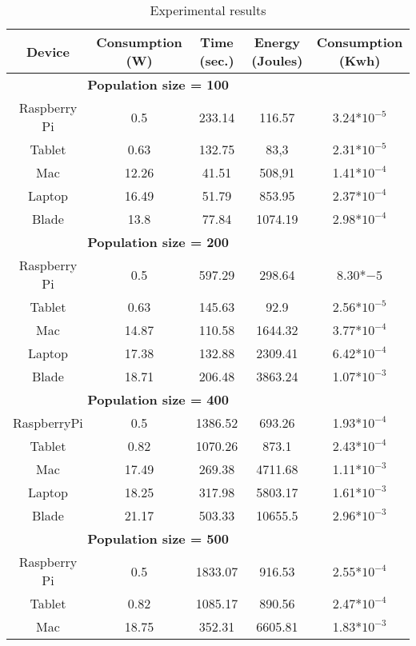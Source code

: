 \begin{small}
 
\begin{table}[!ht]
\renewcommand{\arraystretch}{1.3}
\centering
\caption{Experimental results}
\label{Table:result_todos}
\begin{tabular}{ccccc} \hline
Device & Consumption (W) & Time (sec.) & Energy (Joules) & Consumption (Kwh) \\ \hline
\multicolumn{4}{c}{\textbf{Population size = 100}}\\ %
Raspberry Pi & 0.5 & 233.14 &116.57 & 3.24*$10^{-5}$ \\
Tablet & 0.63 & 132.75 & 83,3&2.31*$10^{-5}$ \\
Mac & 12.26 & 41.51 & 508,91&1.41*$10^{-4}$ \\
Laptop & 16.49 & 51.79 & 853.95& 2.37*$10^{-4}$ \\
Blade & 13.8 & 77.84 & 1074.19&2.98*$10^{-4}$ \\ \hline
\multicolumn{4}{c}{\textbf{Population size = 200}}\\ %
Raspberry Pi &	0.5 &597.29 &298.64 & 8.30*${-5}$ \\
Tablet & 0.63 & 145.63 & 92.9&2.56*$10^{-5}$ \\
Mac & 14.87 & 110.58 & 1644.32&3.77*$10^{-4}$ \\
Laptop	& 17.38 & 132.88 & 2309.41&6.42*$10^{-4}$ \\
Blade & 18.71 & 206.48 & 3863.24&1.07*$10^{-3}$ \\ \hline
\multicolumn{4}{c}{\textbf{Population size = 400}}\\ %
 RaspberryPi&0.5&1386.52& 693.26&1.93*$10^{-4}$ \\
Tablet &0.82&1070.26& 873.1&2.43*$10^{-4}$\\
Mac&17.49&269.38&4711.68&1.11*$10^{-3}$\\
Laptop&18.25&317.98&5803.17 &1.61*$10^{-3}$\\
Blade&21.17&503.33&10655.5&2.96*$10^{-3}$ \\ \hline
\multicolumn{4}{c}{\textbf{Population size = 500}}\\ %
Raspberry Pi & 0.5&1833.07&916.53 &2.55*$10^{-4}$ \\
Tablet & 0.82 & 1085.17& 890.56&2.47*$10^{-4}$ \\
Mac & 18.75 & 352.31 & 6605.81&1.83*$10^{-3}$ \\

\end{tabular}
\end{table}
\end{small}
